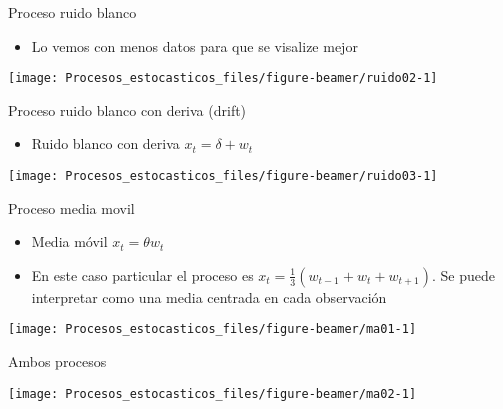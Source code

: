 \documentclass[ignorenonframetext,]{beamer}
\providecommand{\tightlist}{%
  \setlength{\itemsep}{0pt}\setlength{\parskip}{0pt}}
\begin{document}
\begin{frame}{Proceso ruido blanco}

\begin{itemize}
\tightlist
\item
  Lo vemos con menos datos para que se visalize mejor
\end{itemize}

\begin{center}\texttt{[image: Procesos\_estocasticos\_files/figure-beamer/ruido02-1]} \end{center}

\end{frame}

\begin{frame}{Proceso ruido blanco con deriva (drift)}

\begin{itemize}
\tightlist
\item
  Ruido blanco con deriva \(x_t =\delta + w_t\)
\end{itemize}

\begin{center}\texttt{[image: Procesos\_estocasticos\_files/figure-beamer/ruido03-1]} \end{center}

\end{frame}

\begin{frame}{Proceso media movil}

\begin{itemize}
\item
  Media móvil \(x_t = \theta w_t\)
\item
  En este caso particular el proceso es
  \(x_t =\frac{1}{3} (w_{t-1}+w_t+w_{t+1})\). Se puede interpretar como
  una media centrada en cada observación
\end{itemize}

\begin{center}\texttt{[image: Procesos\_estocasticos\_files/figure-beamer/ma01-1]} \end{center}

\end{frame}

\begin{frame}{Ambos procesos}

\begin{center}\texttt{[image: Procesos\_estocasticos\_files/figure-beamer/ma02-1]} \end{center}

\end{frame}
\end{document}
